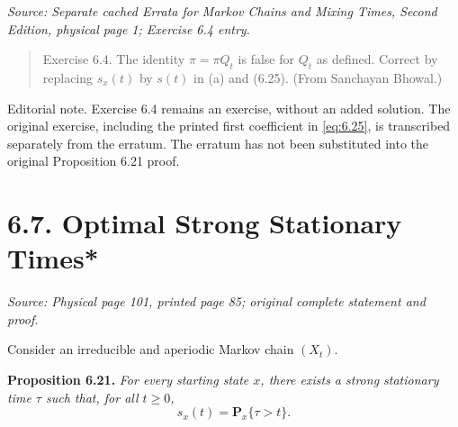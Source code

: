 \documentclass[11pt]{article}
\newcommand{\Px}{\mathbf{P}_x}
\newcommand{\sourceloc}[1]{\par\smallskip\noindent\textit{Source: #1.}\par\nopagebreak[4]\smallskip}
\newcommand{\editorial}[1]{\par\smallskip\noindent\textsf{Editorial note.} #1\par\smallskip}
\begin{document}
\sourceloc{Separate cached \emph{Errata for Markov Chains and Mixing Times, Second Edition}, physical page 1; Exercise 6.4 entry}
\begin{quote}
Exercise 6.4. The identity $\pi=\pi Q_t$ is false for $Q_t$ as defined.
Correct by replacing $s_x(t)$ by $s(t)$ in (a) and (6.25).
(From Sanchayan Bhowal.)
\end{quote}
\editorial{Exercise 6.4 remains an exercise, without an added solution.
The original exercise, including the printed first coefficient in
\eqref{eq:6.25}, is transcribed separately from the erratum. The erratum
has not been substituted into the original Proposition 6.21 proof.}

\clearpage
\section*{6.7. Optimal Strong Stationary Times*}
\sourceloc{Physical page 101, printed page 85; original complete statement and proof}
Consider an irreducible and aperiodic Markov chain $(X_t)$.

\noindent\textbf{Proposition 6.21.} \emph{For every starting state $x$,
there exists a strong stationary time $\tau$ such that, for all $t\ge0$,}
\begin{equation}
s_x(t)=\Px\{\tau>t\}.
\tag{6.20}\label{eq:6.20}
\end{equation}
\end{document}

